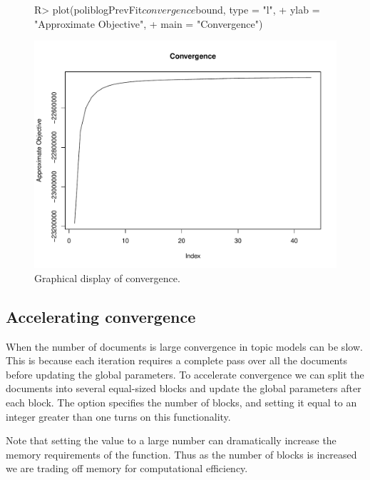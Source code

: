 \documentclass[article,shortnames]{jss}
\begin{document}
\begin{figure}
\begin{center}
\begin{Schunk}
\begin{Sinput}
R> plot(poliblogPrevFit$convergence$bound, type = "l",
+  ylab = "Approximate Objective",
+  main = "Convergence")
\end{Sinput}
\end{Schunk}
\includegraphics{stmVignette-027}
\caption{Graphical display of convergence.}
\label{fig:converge}
\end{center}
\end{figure}

\subsection{Accelerating convergence}
When the number of documents is large convergence in topic models can be slow.  This is because each iteration requires a complete pass over all the documents before updating the global parameters.  To accelerate convergence we can split the documents into several equal-sized blocks and update the global parameters after each block.  The option  specifies the number of blocks, and setting it equal to an integer greater than one turns on this functionality.

Note that setting the  value to a large number can dramatically increase the memory requirements of the function.  Thus as the number of blocks is increased we are trading off memory for computational efficiency.
\end{document}
